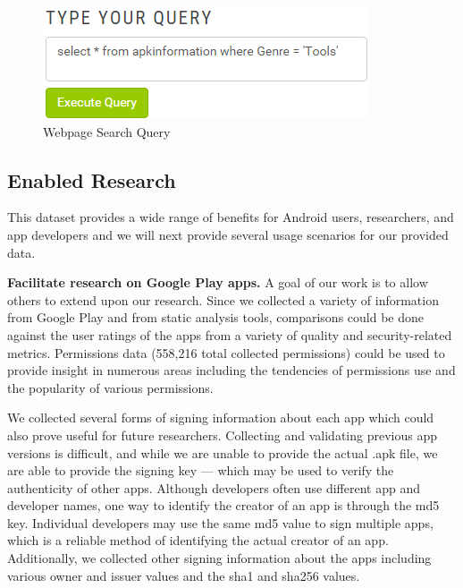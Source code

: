 \documentclass{sig-alternate-05-2015}
\begin{document}
\begin{figure}[ht!]
\centering
\includegraphics[width=\columnwidth, angle = 0, scale=.8]{images/webpageQuery2.png}
\caption{Webpage Search Query}
\label{fig:webpagequery}
\end{figure}






\subsection{Enabled Research}


This dataset provides a wide range of benefits for Android users, researchers, and app developers and we will next provide several usage scenarios for our provided data.

\textbf{Facilitate research on Google Play apps.} A goal of our work is to allow others to extend upon our research. Since we collected a variety of information from Google Play and from static analysis tools, comparisons could be done against the user ratings of the apps from a variety of quality and security-related metrics. Permissions data (558,216 total collected permissions) could be used to provide insight in numerous areas including the tendencies of permissions use and the popularity of various permissions.

We collected several forms of signing information about each app which could also prove useful for future researchers. Collecting and validating previous app versions is difficult, and while we are unable to provide the actual .apk file, we are able to provide the signing key --- which may be used to verify the authenticity of other apps. Although developers often use different app and developer names, one way to identify the creator of an app is through the md5 key. Individual developers may use the same md5 value to sign multiple apps, which is a reliable method of identifying the actual creator of an app. Additionally, we collected  other signing information about the apps including various owner and issuer values and the sha1 and sha256 values.
\end{document}
